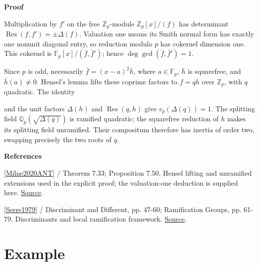 \documentclass[11pt,a4paper,oneside,openany]{book}
\newcommand{\atlasdisplay}[1]{\par\begingroup\centering\vspace{3pt}\noindent\adjustbox{max width=\linewidth}{\(\displaystyle #1\)}\par\vspace{5pt}\endgroup}
\newenvironment{sources}{\par\smallskip\begingroup\footnotesize\color{atlasgray}\leftskip=10pt\setlength{\parskip}{2pt}}{\par\endgroup\smallskip}
\begin{document}
\begin{atlasblock}[standard]
\textbf{\sffamily Proof}\par\smallskip
\color{black} Multiplication by \(f'\) on the free \(\mathbb Z_p\)-module \(\mathbb Z_p[x]/(f)\) has determinant \(\operatorname{Res}(f,f')=\pm\Delta(f)\). Valuation one means its Smith normal form has exactly one nonunit diagonal entry, so reduction modulo \(p\) has cokernel dimension one. This cokernel is \(\mathbb F_p[x]/(\bar f,\bar f')\); hence \(\deg\gcd(\bar f,\bar f')=1\).\par
\color{black} Since \(p\) is odd, necessarily \(\bar f=(x-a)^2\bar h\), where \(a\in\mathbb F_p\), \(\bar h\) is squarefree, and \(\bar h(a)\ne0\). Hensel's lemma lifts these coprime factors to \(f=qh\) over \(\mathbb Z_p\), with \(q\) quadratic. The identity\par

\atlasdisplay{\Delta(f)=\Delta(q)\Delta(h)\operatorname{Res}(q,h)^2}
\color{black} and the unit factors \(\Delta(h)\) and \(\operatorname{Res}(q,h)\) give \(v_p(\Delta(q))=1\). The splitting field \(\mathbb Q_p(\sqrt{\Delta(q)})\) is ramified quadratic; the squarefree reduction of \(h\) makes its splitting field unramified. Their compositum therefore has inertia of order two, swapping precisely the two roots of \(q\).\par
\end{atlasblock}\color{black}
\begin{sources}
\textbf{References}\par\smallskip
\noindent\hyperlink{ref:Milne2020ANT}{[Milne2020ANT]} / Theorem 7.33; Proposition 7.50. Hensel lifting and unramified extensions used in the explicit proof; the valuation-one deduction is supplied here. \href{https://www.jmilne.org/math/CourseNotes/ANT.pdf}{Source}.\par
\noindent\hyperlink{ref:Serre1979}{[Serre1979]} / Discriminant and Different, pp. 47-60; Ramification Groups, pp. 61-79. Discriminants and local ramification framework. \href{https://link.springer.com/book/10.1007/978-1-4757-5673-9}{Source}.\par
\end{sources}\color{black}
\section{Example}
\end{document}
